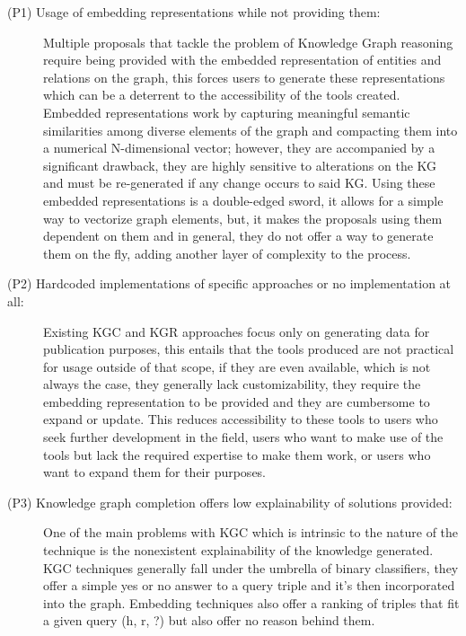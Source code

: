 \begin{description}
    \item[(P1) Usage of embedding representations while not providing them:]
    Multiple proposals that tackle the problem of Knowledge Graph reasoning require being provided with the embedded representation of entities and relations on the graph, this forces users to generate these representations which can be a deterrent to the accessibility of the tools created. 
    Embedded representations work by capturing meaningful semantic similarities among diverse elements of the graph and compacting them into a numerical N-dimensional vector; however, they are accompanied by a significant drawback, they are highly sensitive to alterations on the KG and must be re-generated if any change occurs to said KG.
    Using these embedded representations is a double-edged sword, it allows for a simple way to vectorize graph elements, but, it makes the proposals using them dependent on them and in general, they do not offer a way to generate them on the fly, adding another layer of complexity to the process.\\
    
    \item[(P2) Hardcoded implementations of specific approaches or no implementation at all:] Existing KGC and KGR approaches focus only on generating data for publication purposes, this entails that the tools produced are not practical for usage outside of that scope, if they are even available, which is not always the case, they generally lack customizability, they require the embedding representation to be provided and they are cumbersome to expand or update. This reduces accessibility to these tools to users who seek further development in the field, users who want to make use of the tools but lack the required expertise to make them work, or users who want to expand them for their purposes.\\
    
    \item[(P3) Knowledge graph completion offers low explainability of solutions provided:] One of the main problems with KGC which is intrinsic to the nature of the technique is the nonexistent explainability of the knowledge generated. KGC techniques generally fall under the umbrella of binary classifiers, they offer a simple yes or no answer to a query triple and it's then incorporated into the graph. Embedding techniques also offer a ranking of triples that fit a given query (h, r, ?) but also offer no reason behind them.\\ 
    

\end{description}
